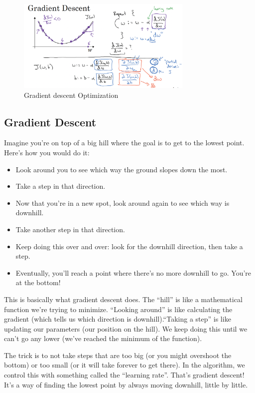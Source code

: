 \documentclass[letterpaper,12pt,notitlepage,twoside]{report}
\begin{document}
\begin{figure}[h]
	\centering
	\includegraphics[width=0.75\textwidth]{Images/Gradient descent.png}
	\caption{Gradient descent Optimization}
	\label{fig:10}
\end{figure}
\FloatBarrier

\subsection{Gradient Descent}
\begin{funfact}
Imagine you're on top of a big hill where the goal is to get to the lowest point.
Here's how you would do it:

\begin{itemize}[nosep]
\item Look around you to see which way the ground slopes down the most. 
\item Take a step in that direction. 
\item Now that you're in a new spot, look around again to see which way is downhill.
\item Take another step in that direction. 
\item Keep doing this over and over: look for the downhill direction, then take a step. 
\item Eventually, you'll reach a point where there's no more downhill to go. You're at the bottom!
\end{itemize}

This is basically what gradient descent does. The ``hill'' is like a mathematical function we're trying to minimize. ``Looking around'' is like calculating the gradient (which tells us which direction is downhill).``Taking a step'' is like updating our parameters (our position on the hill). We keep doing this until we can't go any lower (we've reached the minimum of the function).

The trick is to not take steps that are too big (or you might overshoot the bottom) or too small (or it will take forever to get there). In the algorithm, we control this with something called the ``learning rate''. That's gradient descent! It's a way of finding the lowest point by always moving downhill, little by little.
\end{funfact}
\end{document}
